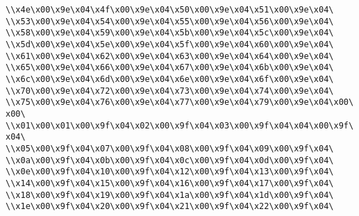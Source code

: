 \verb|\\x4e\x00\x9e\x04\x4f\x00\x9e\x04\x50\x00\x9e\x04\x51\x00\x9e\x04\|\newline
\verb|\\x53\x00\x9e\x04\x54\x00\x9e\x04\x55\x00\x9e\x04\x56\x00\x9e\x04\|\newline
\verb|\\x58\x00\x9e\x04\x59\x00\x9e\x04\x5b\x00\x9e\x04\x5c\x00\x9e\x04\|\newline
\verb|\\x5d\x00\x9e\x04\x5e\x00\x9e\x04\x5f\x00\x9e\x04\x60\x00\x9e\x04\|\newline
\verb|\\x61\x00\x9e\x04\x62\x00\x9e\x04\x63\x00\x9e\x04\x64\x00\x9e\x04\|\newline
\verb|\\x65\x00\x9e\x04\x66\x00\x9e\x04\x67\x00\x9e\x04\x6b\x00\x9e\x04\|\newline
\verb|\\x6c\x00\x9e\x04\x6d\x00\x9e\x04\x6e\x00\x9e\x04\x6f\x00\x9e\x04\|\newline
\verb|\\x70\x00\x9e\x04\x72\x00\x9e\x04\x73\x00\x9e\x04\x74\x00\x9e\x04\|\newline
\verb|\\x75\x00\x9e\x04\x76\x00\x9e\x04\x77\x00\x9e\x04\x79\x00\x9e\x04\x00\x00\|\newline
\verb|\\x01\x00\x01\x00\x9f\x04\x02\x00\x9f\x04\x03\x00\x9f\x04\x04\x00\x9f\x04\|\newline
\verb|\\x05\x00\x9f\x04\x07\x00\x9f\x04\x08\x00\x9f\x04\x09\x00\x9f\x04\|\newline
\verb|\\x0a\x00\x9f\x04\x0b\x00\x9f\x04\x0c\x00\x9f\x04\x0d\x00\x9f\x04\|\newline
\verb|\\x0e\x00\x9f\x04\x10\x00\x9f\x04\x12\x00\x9f\x04\x13\x00\x9f\x04\|\newline
\verb|\\x14\x00\x9f\x04\x15\x00\x9f\x04\x16\x00\x9f\x04\x17\x00\x9f\x04\|\newline
\verb|\\x18\x00\x9f\x04\x19\x00\x9f\x04\x1a\x00\x9f\x04\x1d\x00\x9f\x04\|\newline
\verb|\\x1e\x00\x9f\x04\x20\x00\x9f\x04\x21\x00\x9f\x04\x22\x00\x9f\x04\|\newline
